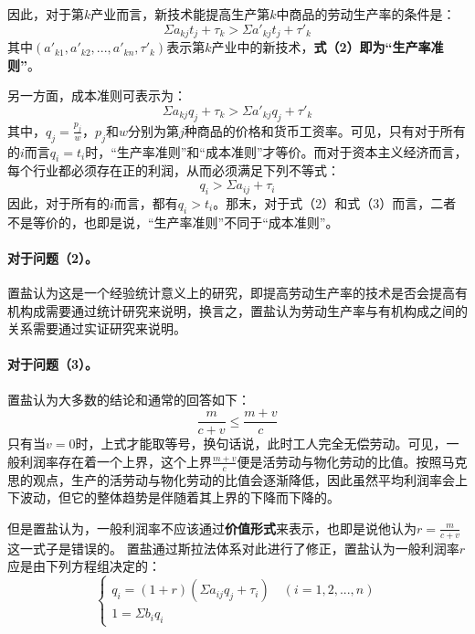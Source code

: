 \documentclass[a4paper,twoside,12pt,AutoFakeBold]{ctexart}
\begin{document}
因此，对于第$k$产业而言，新技术能提高生产第$k$中商品的劳动生产率的条件是：
\begin{equation}\tag{2}
    \Sigma a_{kj}t_j+\tau_k >\Sigma a'_{kj}t_j+\tau'_k
\end{equation}
其中$(a'_{k1},a'_{k2},...,a'_{kn},\tau'_k)$表示第$k$产业中的新技术，\textbf{式（2）即为“生产率准则”}。

另一方面，成本准则可表示为：
\begin{equation}\tag{3}
    \Sigma a_{kj}q_j+\tau_k >\Sigma a'_{kj}q_j+\tau'_k
\end{equation}
其中，$q_j=\frac{p_j}{w}$，$p_j$和$w$分别为第$j$种商品的价格和货币工资率。可见，只有对于所有的$i$而言$q_i=t_i$时，“生产率准则”和“成本准则”才等价。而对于资本主义经济而言，每个行业都必须存在正的利润，从而必须满足下列不等式：
\begin{equation}\tag{4}
    q_i> \Sigma a_{ij}+\tau_i
\end{equation}
因此，对于所有的$i$而言，都有$q_i>t_i$。那末，对于式（2）和式（3）而言，二者不是等价的，也即是说，“生产率准则”不同于“成本准则”。

\paragraph{对于问题（2）。}置盐认为这是一个经验统计意义上的研究，即提高劳动生产率的技术是否会提高有机构成需要通过统计研究来说明，换言之，置盐认为劳动生产率与有机构成之间的关系需要通过实证研究来说明。

\paragraph{对于问题（3）。}置盐认为大多数的结论和通常的回答如下：
\begin{equation}\tag{5}
    \frac{m}{c+v} \leq \frac{m+v}{c}
\end{equation}
只有当$v=0$时，上式才能取等号，换句话说，此时工人完全无偿劳动。可见，一般利润率存在着一个上界，这个上界$\frac{m+v}{c}$便是活劳动与物化劳动的比值。按照马克思的观点，生产的活劳动与物化劳动的比值会逐渐降低，因此虽然平均利润率会上下波动，但它的整体趋势是伴随着其上界的下降而下降的。

但是置盐认为，一般利润率不应该通过\textbf{价值形式}来表示，也即是说他认为$r=\frac{m}{c+v}$这一式子是错误的。
置盐通过斯拉法体系对此进行了修正，置盐认为一般利润率$r$应是由下列方程组决定的：
\begin{equation}\tag{6}
    \begin{cases}
        q_i=(1+r)(\Sigma a_{ij}q_j+\tau_i)\quad(i=1,2,...,n)\\
        1=\Sigma b_iq_i
    \end{cases}
\end{equation}
\end{document}

